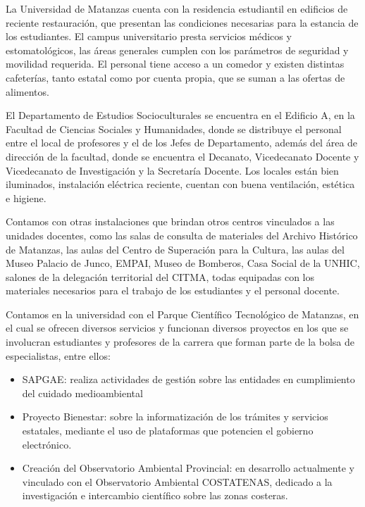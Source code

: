 La Universidad de Matanzas cuenta con la residencia estudiantil en edificios de reciente restauración, que presentan las condiciones necesarias para la estancia de los estudiantes. El campus universitario presta servicios médicos y estomatológicos, las áreas generales cumplen con los parámetros de seguridad y movilidad requerida. El personal tiene acceso a un comedor y existen distintas cafeterías, tanto estatal como por cuenta propia, que se suman a las ofertas de alimentos.

El Departamento de Estudios Socioculturales se encuentra en el Edificio A, en la Facultad de Ciencias Sociales y Humanidades, donde se distribuye el personal entre el local de profesores y el de los Jefes de Departamento, además del área de dirección de la facultad, donde se encuentra el Decanato, Vicedecanato Docente y Vicedecanato de Investigación y la Secretaría Docente. Los locales están bien iluminados, instalación eléctrica reciente, cuentan con buena ventilación, estética e higiene.

Contamos con otras instalaciones que brindan otros centros vinculados a las unidades docentes, como las salas de consulta de materiales del Archivo Histórico de Matanzas, las aulas del Centro de Superación para la Cultura, las aulas del Museo Palacio de Junco, EMPAI, Museo de Bomberos, Casa Social de la UNHIC, salones de la delegación territorial del CITMA, todas equipadas con los materiales necesarios para el trabajo de los estudiantes y el personal docente.
 
Contamos en la universidad con el Parque Científico Tecnológico de Matanzas, en el cual se ofrecen diversos servicios y funcionan diversos proyectos en los que se involucran estudiantes y profesores de la carrera que forman parte de la bolsa de especialistas, entre ellos:

\begin{itemize}
	\setlength\itemsep{-0.5em}
	\item SAPGAE: realiza actividades de gestión sobre las entidades en cumplimiento del cuidado medioambiental 
	\item Proyecto Bienestar: sobre la informatización de los trámites y servicios estatales, mediante el uso de plataformas que potencien el gobierno electrónico.
	\item Creación del Observatorio Ambiental Provincial: en desarrollo actualmente y vinculado con el Observatorio Ambiental COSTATENAS, dedicado a la investigación e intercambio científico sobre las zonas costeras.
\end{itemize}


